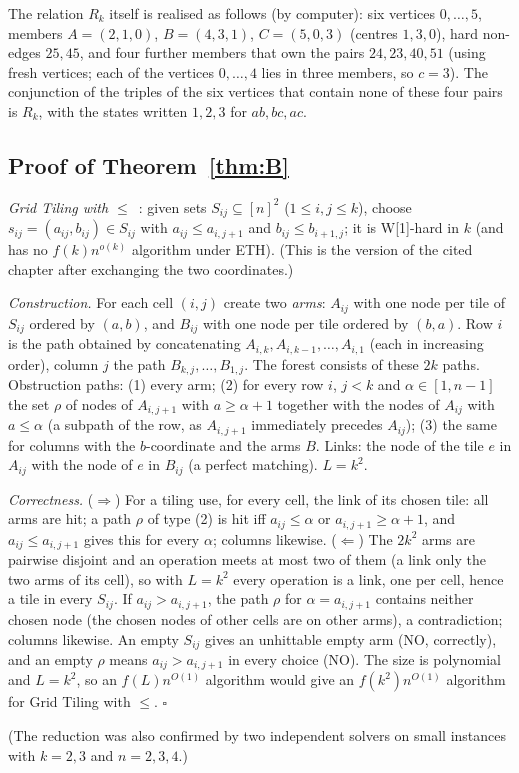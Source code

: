 The relation $R_k$ itself is realised as follows (by computer): six vertices $0,\dots,5$, members $A=(2,1,0)$, $B=(4,3,1)$, $C=(5,0,3)$ (centres $1,3,0$), hard non-edges $25,45$, and four further members that own the pairs $24,23,40,51$ (using fresh vertices; each of the vertices $0,\dots,4$ lies in three members, so $c=3$). The conjunction of the triples of the six vertices that contain none of these four pairs is $R_k$, with the states written $1,2,3$ for $ab,bc,ac$.

\subsection{Proof of Theorem~\ref{thm:B}}\label{app:softB}
\emph{Grid Tiling with $\le$}~\cite{Cygan15}: given sets $S_{ij}\subseteq[n]^2$ ($1\le i,j\le k$), choose $s_{ij}=(a_{ij},b_{ij})\in S_{ij}$ with $a_{ij}\le a_{i,j+1}$ and $b_{ij}\le b_{i+1,j}$; it is W[1]-hard in $k$ (and has no $f(k)n^{o(k)}$ algorithm under ETH). (This is the version of the cited chapter after exchanging the two coordinates.)

\emph{Construction.} For each cell $(i,j)$ create two \emph{arms}: $A_{ij}$ with one node per tile of $S_{ij}$ ordered by $(a,b)$, and $B_{ij}$ with one node per tile ordered by $(b,a)$. Row $i$ is the path obtained by concatenating $A_{i,k},A_{i,k-1},\dots,A_{i,1}$ (each in increasing order), column $j$ the path $B_{k,j},\dots,B_{1,j}$. The forest consists of these $2k$ paths. Obstruction paths: (1) every arm; (2) for every row $i$, $j<k$ and $\alpha\in[1,n-1]$ the set $\rho$ of nodes of $A_{i,j+1}$ with $a\ge\alpha+1$ together with the nodes of $A_{ij}$ with $a\le\alpha$ (a subpath of the row, as $A_{i,j+1}$ immediately precedes $A_{ij}$); (3) the same for columns with the $b$-coordinate and the arms $B$. Links: the node of the tile $e$ in $A_{ij}$ with the node of $e$ in $B_{ij}$ (a perfect matching). $L=k^2$.

\emph{Correctness.} ($\Rightarrow$) For a tiling use, for every cell, the link of its chosen tile: all arms are hit; a path $\rho$ of type (2) is hit iff $a_{ij}\le\alpha$ or $a_{i,j+1}\ge\alpha+1$, and $a_{ij}\le a_{i,j+1}$ gives this for every $\alpha$; columns likewise. ($\Leftarrow$) The $2k^2$ arms are pairwise disjoint and an operation meets at most two of them (a link only the two arms of its cell), so with $L=k^2$ every operation is a link, one per cell, hence a tile in every $S_{ij}$. If $a_{ij}>a_{i,j+1}$, the path $\rho$ for $\alpha=a_{i,j+1}$ contains neither chosen node (the chosen nodes of other cells are on other arms), a contradiction; columns likewise. An empty $S_{ij}$ gives an unhittable empty arm (NO, correctly), and an empty $\rho$ means $a_{ij}>a_{i,j+1}$ in every choice (NO). The size is polynomial and $L=k^2$, so an $f(L)n^{O(1)}$ algorithm would give an $f(k^2)n^{O(1)}$ algorithm for Grid Tiling with $\le$. \hfill$\square$

(The reduction was also confirmed by two independent solvers on small instances with $k=2,3$ and $n=2,3,4$.)
